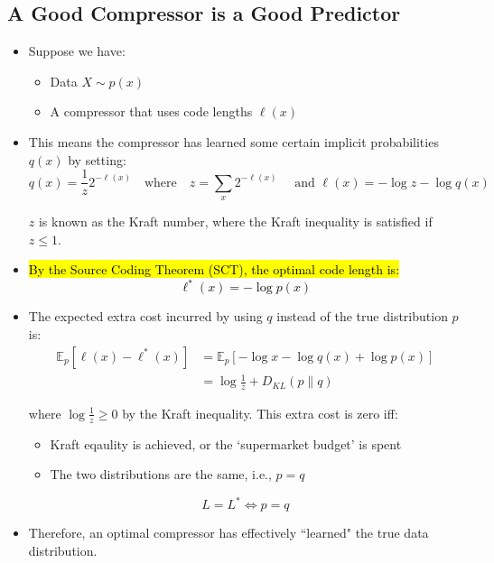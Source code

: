 \subsection{A Good Compressor is a Good Predictor}

\begin{itemize}
    \item Suppose we have:
          \begin{itemize}
              \item Data \( X \sim p(x) \)
              \item A compressor that uses code lengths \( \ell(x) \)
          \end{itemize}

    \item This means the compressor has learned some certain implicit probabilities \( q(x) \) by setting:
          \[
              q(x) = \frac{1}{z} 2^{-\ell(x)} \quad \text{where} \quad z = \sum_x 2^{-\ell(x)} \quad \text{ and } \ell(x) = -\log z - \log q(x)
          \]

          \(z\) is known as the Kraft number, where the Kraft inequality is satisfied if \( z \leq 1 \).

    \item \hl{By the Source Coding Theorem (SCT), the optimal code length is:
    \[
        \ell^*(x) = -\log p(x)
    \]}


    \item The expected extra cost incurred by using \( q \) instead of the true distribution \( p \) is:
          \begin{align*}
              \mathbb{E}_p [\ell(x) - \ell^*(x)] & = \mathbb{E}_p\left[ -\log x - \log q(x) + \log p(x)\right] \\
                                                 & = \log \frac{1}{z} + D_{KL}(p \parallel q)
          \end{align*}

          where \(\log \frac{1}{z} \geq 0\) by the Kraft inequality. This extra cost is zero iff:
          \begin{itemize}
              \item Kraft eqaulity is achieved, or the `supermarket budget' is spent
              \item The two distributions are the same, i.e., \( p = q \)
          \end{itemize}

          \[
              L = L^* \Leftrightarrow p = q
          \]

    \item Therefore, an optimal compressor has effectively ``learned" the true data distribution.
\end{itemize}

